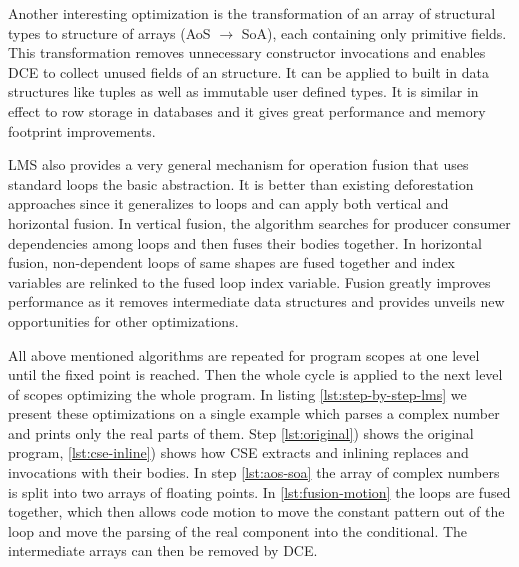 Another interesting optimization is the transformation of an array of structural types to structure of arrays (AoS $\rightarrow$ SoA), each containing only primitive fields. This transformation removes unnecessary constructor invocations and enables DCE to collect unused fields of an structure. It can be applied to built in data structures like tuples as well as immutable user defined types. It is similar in effect to row storage in databases and it gives great performance and memory footprint improvements.

LMS also provides a very general mechanism for operation fusion that uses standard loops the basic abstraction. It is better than existing deforestation approaches since it generalizes to loops and can apply both vertical and horizontal fusion. In vertical fusion, the algorithm searches for producer consumer dependencies among loops and then fuses their bodies together. In horizontal fusion, non-dependent loops of same shapes are fused together and index variables are relinked to the fused loop index variable. Fusion greatly improves performance as it removes intermediate data structures and provides unveils new opportunities for other optimizations.

All above mentioned algorithms are repeated for program scopes at one level until the fixed point is reached. Then the whole cycle is applied to the next level of scopes optimizing the whole program. In listing \ref{lst:step-by-step-lms} we present these optimizations on a single example which parses a complex number and prints only the real parts of them. Step \ref{lst:original}) shows the original program, \ref{lst:cse-inline}) shows how CSE extracts  and inlining replaces  and  invocations with their bodies. In step \ref{lst:aos-soa} the array  of complex numbers is split into two arrays of floating points. 
In \ref{lst:fusion-motion} the loops are fused together, which then allows code motion to move the constant pattern out of the loop and move the parsing of the real component into the conditional. The intermediate arrays can then be removed by DCE.

